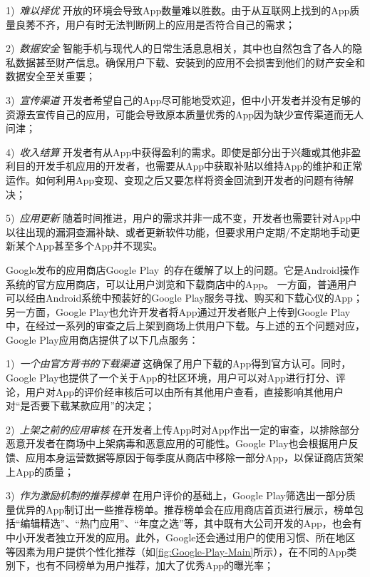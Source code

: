 1)\ \emph{难以择优} \quad
开放的环境会导致App数量难以胜数。由于从互联网上找到的App质量良莠不齐，用户有时无法判断网上的应用是否符合自己的需求；

2)\ \emph{数据安全} \quad
智能手机与现代人的日常生活息息相关，其中也自然包含了各人的隐私数据甚至财产信息。确保用户下载、安装到的应用不会损害到他们的财产安全和数据安全至关重要；

3)\ \emph{宣传渠道} \quad
开发者希望自己的App尽可能地受欢迎，但中小开发者并没有足够的资源去宣传自己的应用，可能会导致原本质量优秀的App因为缺少宣传渠道而无人问津；

4)\ \emph{收入结算} \quad
开发者有从App中获得盈利的需求。即使是部分出于兴趣或其他非盈利目的开发手机应用的开发者，也需要从App中获取补贴以维持App的维护和正常运作。如何利用App变现、变现之后又要怎样将资金回流到开发者的问题有待解决；

5)\ \emph{应用更新} \quad
随着时间推进，用户的需求并非一成不变，开发者也需要针对App中以往出现的漏洞查漏补缺、或者更新软件功能，但要求用户定期/不定期地手动更新某个App甚至多个App并不现实。

Google发布的应用商店Google Play~\cite{GooglePlay}的存在缓解了以上的问题。它是Android操作系统的官方应用商店，可以让用户浏览和下载商店中的App。
一方面，普通用户可以经由Android系统中预装好的Google Play服务寻找、购买和下载心仪的App；另一方面，Google Play也允许开发者将App通过开发者账户上传到Google Play中，在经过一系列的审查之后上架到商场上供用户下载。与上述的五个问题对应，Google Play应用商店提供了以下几点服务：

1)\ \emph{一个由官方背书的下载渠道} \quad
这确保了用户下载的App得到官方认可。同时，Google Play也提供了一个关于App的社区环境，用户可以对App进行打分、评论，用户对App的评价经审核后可以由所有其他用户查看，直接影响其他用户对``是否要下载某款应用''的决定；

2)\ \emph{上架之前的应用审核} \quad
在开发者上传App时对App作出一定的审查，以排除部分恶意开发者在商场中上架病毒和恶意应用的可能性。Google Play也会根据用户反馈、应用本身运营数据等原因于每季度从商店中移除一部分App，以保证商店货架上App的质量；

3)\ \emph{作为激励机制的推荐榜单} \quad
在用户评价的基础上，Google Play筛选出一部分质量优异的App制订出一些推荐榜单。推荐榜单会在应用商店首页进行展示，榜单包括``编辑精选''、``热门应用''、``年度之选''等，其中既有大公司开发的App，也会有中小开发者独立开发的应用。此外，Google还会通过用户的使用习惯、所在地区等因素为用户提供个性化推荐（如\autoref{fig:Google-Play-Main}所示），在不同的App类别下，也有不同榜单为用户推荐，加大了优秀App的曝光率；

